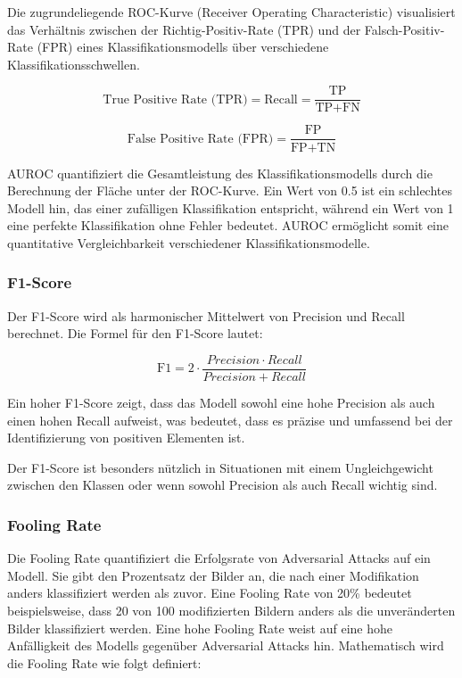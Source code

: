 Die zugrundeliegende ROC-Kurve (Receiver Operating Characteristic) visualisiert das Verhältnis zwischen der Richtig-Positiv-Rate (TPR) und der Falsch-Positiv-Rate (FPR) eines Klassifikationsmodells über verschiedene Klassifikationsschwellen. 

\begin{equation}
    \text{True Positive Rate (TPR)} = \text{Recall} =\frac{\text{TP}}{\text{TP} + \text{FN}}
    \label{eq:TPR}
\end{equation}

\begin{equation}
    \text{False Positive Rate (FPR)} = \frac{\text{FP}}{\text{FP} + \text{TN}} 
    \label{eq:FPR}
\end{equation}

AUROC quantifiziert die Gesamtleistung des Klassifikationsmodells durch die Berechnung der Fläche unter der ROC-Kurve. Ein Wert von 0.5 ist ein schlechtes Modell hin, das einer zufälligen Klassifikation entspricht, während ein Wert von 1 eine perfekte Klassifikation ohne Fehler bedeutet. AUROC ermöglicht somit eine quantitative Vergleichbarkeit verschiedener Klassifikationsmodelle.

\subsubsection{F1-Score} \label{chap:f1-score}
Der F1-Score wird als harmonischer Mittelwert von Precision und Recall berechnet. Die Formel für den F1-Score lautet:

\begin{equation}
    \text{F1} = 2 \cdot \frac{Precision \cdot Recall}{Precision + Recall}
    \label{eq:F1Score}
\end{equation}

Ein hoher F1-Score zeigt, dass das Modell sowohl eine hohe Precision als auch einen hohen Recall aufweist, was bedeutet, dass es präzise und umfassend bei der Identifizierung von positiven Elementen ist.

Der F1-Score ist besonders nützlich in Situationen mit einem Ungleichgewicht zwischen den Klassen oder wenn sowohl Precision als auch Recall wichtig sind.

\subsubsection{Fooling Rate} \label{chap:fooling rate}
Die Fooling Rate quantifiziert die Erfolgsrate von Adversarial Attacks auf ein Modell. Sie gibt den Prozentsatz der Bilder an, die nach einer Modifikation anders klassifiziert werden als zuvor. Eine Fooling Rate von 20\% bedeutet beispielsweise, dass 20 von 100 modifizierten Bildern anders als die unveränderten Bilder klassifiziert werden. Eine hohe Fooling Rate weist auf eine hohe Anfälligkeit des Modells gegenüber Adversarial Attacks hin. Mathematisch wird die Fooling Rate wie folgt definiert:

